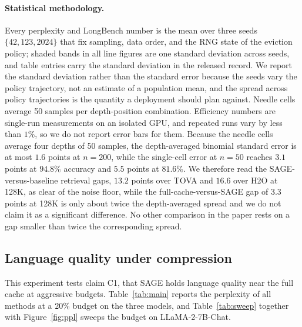 \paragraph{Statistical methodology.}
Every perplexity and LongBench number is the mean over three seeds
$\{42, 123, 2024\}$ that fix sampling, data order, and the RNG state of
the eviction policy; shaded bands in all line figures are one standard
deviation across seeds, and table entries carry the standard deviation
in the released record. We report the standard deviation rather than
the standard error because the seeds vary the policy trajectory, not an
estimate of a population mean, and the spread across policy trajectories
is the quantity a deployment should plan against. Needle cells average
50 samples per depth-position combination.
Efficiency numbers are single-run measurements on an isolated GPU, and
repeated runs vary by less than $1\%$, so we do not report error bars
for them. Because the needle cells average four depths of 50 samples,
the depth-averaged binomial standard error is at most $1.6$ points at
$n = 200$, while the single-cell error at $n = 50$ reaches $3.1$ points
at $94.8\%$ accuracy and $5.5$ points at $81.6\%$. We therefore read
the SAGE-versus-baseline retrieval gaps, $13.2$ points over TOVA and
$16.6$ over H2O at 128K, as clear of the noise floor, while the
full-cache-versus-SAGE gap of $3.3$ points at 128K is only about twice
the depth-averaged spread and we do not claim it as a significant
difference. No other comparison in the paper rests on a gap smaller
than twice the corresponding spread.

\subsection{Language quality under compression}\label{sec:exp_ppl}

This experiment tests claim C1, that SAGE holds language quality near
the full cache at aggressive budgets. Table~\ref{tab:main} reports the
perplexity of all methods at a $20\%$ budget on the three models, and
Table~\ref{tab:sweep} together with Figure~\ref{fig:ppl} sweeps the
budget on LLaMA-2-7B-Chat.

